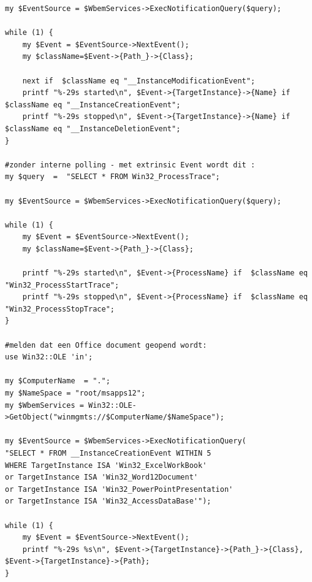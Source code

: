 \documentclass[11pt,a4paper]{report}
\begin{document}
\begin{enumerate}[resume]
\begin{lstlisting}
my $EventSource = $WbemServices->ExecNotificationQuery($query);

while (1) {
	my $Event = $EventSource->NextEvent();
	my $className=$Event->{Path_}->{Class};
	
	next if  $className eq "__InstanceModificationEvent";
	printf "%-29s started\n", $Event->{TargetInstance}->{Name} if  $className eq "__InstanceCreationEvent";
	printf "%-29s stopped\n", $Event->{TargetInstance}->{Name} if  $className eq "__InstanceDeletionEvent";
}

#zonder interne polling - met extrinsic Event wordt dit :
my $query  =  "SELECT * FROM Win32_ProcessTrace";

my $EventSource = $WbemServices->ExecNotificationQuery($query);

while (1) {
	my $Event = $EventSource->NextEvent();
	my $className=$Event->{Path_}->{Class};
	
	printf "%-29s started\n", $Event->{ProcessName} if  $className eq "Win32_ProcessStartTrace";
	printf "%-29s stopped\n", $Event->{ProcessName} if  $className eq "Win32_ProcessStopTrace";
}

#melden dat een Office document geopend wordt:
use Win32::OLE 'in';

my $ComputerName  = ".";
my $NameSpace = "root/msapps12";
my $WbemServices = Win32::OLE->GetObject("winmgmts://$ComputerName/$NameSpace");

my $EventSource = $WbemServices->ExecNotificationQuery(
"SELECT * FROM __InstanceCreationEvent WITHIN 5
WHERE TargetInstance ISA 'Win32_ExcelWorkBook'
or TargetInstance ISA 'Win32_Word12Document'
or TargetInstance ISA 'Win32_PowerPointPresentation'
or TargetInstance ISA 'Win32_AccessDataBase'");

while (1) {
	my $Event = $EventSource->NextEvent();
	printf "%-29s %s\n", $Event->{TargetInstance}->{Path_}->{Class}, $Event->{TargetInstance}->{Path};
}

	\end{lstlisting}
\end{enumerate}
\end{document}
